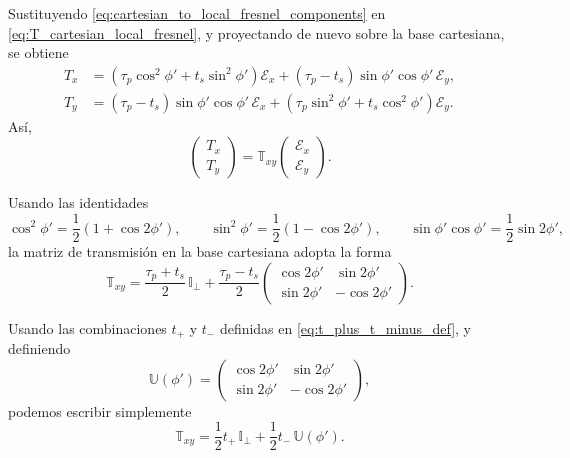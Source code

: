 Sustituyendo \eqref{eq:cartesian_to_local_fresnel_components} en
\eqref{eq:T_cartesian_local_fresnel}, y proyectando de nuevo sobre la base
cartesiana, se obtiene
\begin{equation}
\begin{aligned}
T_x
&=
\left(
\tau_p\cos^2\phi'
+
t_s\sin^2\phi'
\right)\mathscr E_x
+
\left(
\tau_p-t_s
\right)
\sin\phi'\cos\phi'\,\mathscr E_y,
\\
T_y
&=
\left(
\tau_p-t_s
\right)
\sin\phi'\cos\phi'\,\mathscr E_x
+
\left(
\tau_p\sin^2\phi'
+
t_s\cos^2\phi'
\right)\mathscr E_y.
\end{aligned}
\label{eq:Tx_Ty_before_trig_reduction}
\end{equation}
Así,
\begin{equation}
  \begin{pmatrix}
    T_x\\
    T_y
  \end{pmatrix}
  =
  \mathbb T_{xy}
  \begin{pmatrix}
    \mathscr E_x\\
    \mathscr E_y
  \end{pmatrix}.
\label{eq:T_cartesian_matrix_def}
\end{equation}

Usando las identidades
\begin{equation}
\cos^2\phi'
=
\frac{1}{2}
\left(
1+\cos2\phi'
\right),
\qquad
\sin^2\phi'
=
\frac{1}{2}
\left(
1-\cos2\phi'
\right),
\qquad
\sin\phi'\cos\phi'
=
\frac{1}{2}\sin2\phi',
\end{equation}
la matriz de transmisión en la base cartesiana adopta la forma
\begin{equation}
\boxed{
  \mathbb T_{xy}
  =
  \frac{\tau_p+t_s}{2}\,\mathbb I_\perp
  +
  \frac{\tau_p-t_s}{2}
  \begin{pmatrix}
    \cos 2\phi' & \sin 2\phi' \\
    \sin 2\phi' & -\cos 2\phi'
  \end{pmatrix}.
}
\label{eq:M_in_cartesian_basis}
\end{equation}

Usando las combinaciones $t_+$ y $t_-$ definidas en \eqref{eq:t_plus_t_minus_def}, y definiendo
\begin{equation}
  \mathbb U(\phi')
  =
  \begin{pmatrix}
    \cos 2\phi' & \sin 2\phi' \\
    \sin 2\phi' & -\cos 2\phi'
  \end{pmatrix},
\label{eq:U_phi_cartesian_def}
\end{equation}
podemos escribir simplemente
\begin{equation}
  \mathbb T_{xy}
  =
  \frac{1}{2}t_+\,\mathbb I_\perp
  +
  \frac{1}{2}t_-\,\mathbb U(\phi').
\label{eq:M_cartesian_tplus_tminus}
\end{equation}

